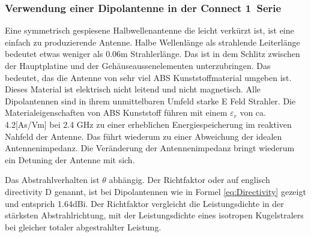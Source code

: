 \subsubsection{Verwendung einer Dipolantenne in der  \glqq Connect 1\grqq \  Serie}
Eine symmetrisch gespiesene Halbwellenantenne die leicht verkürzt ist,  ist eine einfach zu produzierende Antenne. Halbe Wellenlänge als strahlende Leiterlänge bedeutet etwas weniger als 0.06m Strahlerlänge. Das ist in dem Schlitz zwischen der Hauptplatine und der Gehäuseaussenelementen unterzubringen. 
Das bedeutet, das die Antenne von sehr viel ABS Kunststoffmaterial umgeben ist. Dieses Material ist elektrisch nicht leitend und nicht magnetisch. Alle Dipolantennen sind in ihrem unmittelbaren Umfeld starke E Feld Strahler.  Die Materialeigenschaften von ABS Kunststoff führen mit einem  $\varepsilon_r$ von ca. 4.2[As/Vm] bei 2.4 GHz zu einer erheblichen Energiespeicherung im reaktiven Nahfeld der Antenne. Das führt wiederum zu einer Abweichung der idealen Antennenimpedanz. Die Veränderung der Antennenimpedanz bringt wiederum ein Detuning der Antenne mit sich.


Das Abstrahlverhalten ist $\theta$ abhängig. Der Richtfaktor oder auf englisch directivity D genannt, ist bei Dipolantennen wie in Formel \ref{eq:Directivity} gezeigt und entsprich  1.64dBi.  Der Richtfaktor vergleicht die Leistungsdichte in der stärksten Abstrahlrichtung, mit der Leistungsdichte eines isotropen Kugelstralers bei gleicher totaler abgestrahlter Leistung. 

